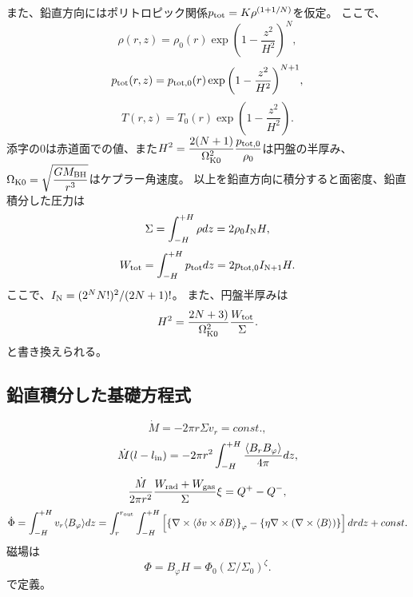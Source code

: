 \documentclass[11pt, oneside]{article}   	%
\begin{document}
また、鉛直方向にはポリトロピック関係$p_{\rm tot}=K\rho^{(1+1/N)}$を仮定。
ここで、
\begin{equation}
	\rho(r,z) = \rho_0(r) \exp{\left(1-\frac{z^2}{H^2}\right)^N},
\end{equation}
\begin{equation}
	p_{\rm tot}(r,z) = p_{\rm tot,0}(r) \exp{\left(1-\frac{z^2}{H^2}\right)^{N+1}},
\end{equation}
\begin{equation}
	T(r,z) = T_{0}(r) \exp{\left(1-\frac{z^2}{H^2}\right)}.
\end{equation}
添字の0は赤道面での値、また$\displaystyle H^2 = \frac{2(N+1)}{\Omega_{\rm K0}^2}\frac{p_{\rm tot,0}}{\rho_0}$は円盤の半厚み、$\displaystyle \Omega_{\rm K0} = \sqrt{\frac{GM_{\rm BH}}{r^3}}$はケプラー角速度。
以上を鉛直方向に積分すると面密度、鉛直積分した圧力は
\begin{equation}
	\Sigma = \int^{+H}_{-H} \rho dz = 2\rho_0I_{\rm N} H,
\end{equation}
\begin{equation}
	W_{\rm tot} = \int^{+H}_{-H} p_{\rm tot} dz = 2p_{\rm tot,0}I_{\rm N+1} H.
\end{equation}
ここで、$I_{\rm N} = (2^NN!)^2/(2N+1)!$。
また、円盤半厚みは
\begin{equation}
	H^2 = \frac{2N+3)}{\Omega_{\rm K0}^2}\frac{W_{\rm tot}}{\Sigma}.
\end{equation}
と書き換えられる。
 
 \subsection{鉛直積分した基礎方程式}
 \begin{equation}
	\dot{M} = -2\pi r\Sigma v_r = const.,
\end{equation}
\begin{equation}
	\dot{M}(l - l_{\rm in}) = -2\pi r^2 \int^{+H}_{-H} \frac{\langle B_rB_\varphi \rangle}{4\pi} dz,
\end{equation}
\begin{equation}
	\frac{\dot{M}}{2\pi r^2} \frac{W_{\rm rad}+W_{\rm gas}}{\Sigma}\xi = Q^+ - Q^-,
\end{equation}
\begin{equation}
	\dot{\Phi} = \int^{+H}_{-H} v_r\langle B_\varphi \rangle dz = \int^{r_{\rm out}}_{r}\int^{+H}_{-H}\left[\left\{\nabla\times\langle\delta{v}\times\delta{B}\rangle\right\}_{\varphi} - \left\{\eta\nabla\times\left(\nabla\times\langle {B} \rangle \right)\right\} \right]drdz + const.
	\label{eq4:ind}
\end{equation}
磁場は
\begin{equation}
	\Phi = B_\varphi H = \Phi_0(\Sigma/\Sigma_0)^\zeta.
\end{equation}
で定義。
\end{document}
